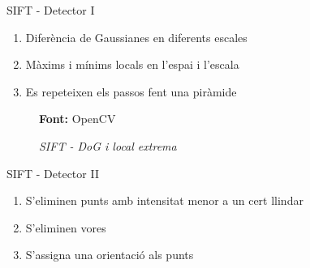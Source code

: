 \documentclass[xcolor=table, 11pt]{beamer}
\newcommand*{\captionsource}[2]{%
  \caption[{#1}]{#1}\par
  \vspace{-0.4cm}
  \tiny{\textbf{Font:} #2\par}}
\newcommand\tz{\fontsize{13}{15.6}\selectfont}
\begin{document}
	\begin{frame}{SIFT - Detector I}
		\tz
		\begin{enumerate}
			\item{Diferència de Gaussianes en diferents escales}
			\item{Màxims i mínims locals en l'espai i l'escala}
			\item{Es repeteixen els passos fent una piràmide}
			\setcounter{enumTemp}{\theenumi}
		\end{enumerate}
		\begin{figure}[H]
			\captionsource{\textit{SIFT - DoG i \textit{local extrema}}}{OpenCV}
		\end{figure}
	\end{frame}

	\begin{frame}{SIFT - Detector II}
		\tz
		\begin{enumerate}
			\setcounter{enumi}{\theenumTemp}
			\item{S'eliminen punts amb intensitat menor a un cert llindar}
			\item{S'eliminen vores}
			\item{S'assigna una orientació als punts}
		\end{enumerate}
	\end{frame}
\end{document}
